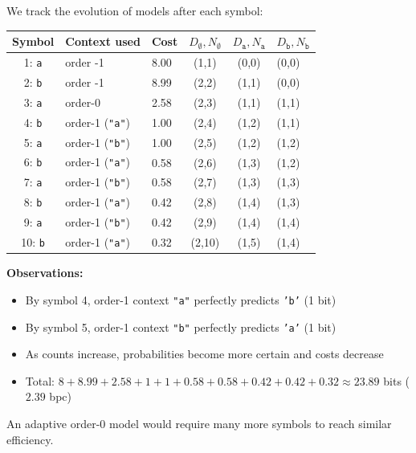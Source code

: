 \begin{examplebox}

We track the evolution of models after each symbol:

\begin{center}
\footnotesize
\begin{tabular}{|c|l|l|c|c|l|}
\hline
\textbf{Symbol} & \textbf{Context used} & \textbf{Cost} & $D_{\emptyset},N_{\emptyset}$ & $D_{\texttt{a}},N_{\texttt{a}}$ & $D_{\texttt{b}},N_{\texttt{b}}$ \\
\hline
1: \texttt{a} & order -1 & 8.00 & (1,1) & (0,0) & (0,0) \\
2: \texttt{b} & order -1 & 8.99 & (2,2) & (1,1) & (0,0) \\
3: \texttt{a} & order-0 & 2.58 & (2,3) & (1,1) & (1,1) \\
4: \texttt{b} & order-1 (\texttt{"a"}) & 1.00 & (2,4) & (1,2) & (1,1) \\
5: \texttt{a} & order-1 (\texttt{"b"}) & 1.00 & (2,5) & (1,2) & (1,2) \\
6: \texttt{b} & order-1 (\texttt{"a"}) & 0.58 & (2,6) & (1,3) & (1,2) \\
7: \texttt{a} & order-1 (\texttt{"b"}) & 0.58 & (2,7) & (1,3) & (1,3) \\
8: \texttt{b} & order-1 (\texttt{"a"}) & 0.42 & (2,8) & (1,4) & (1,3) \\
9: \texttt{a} & order-1 (\texttt{"b"}) & 0.42 & (2,9) & (1,4) & (1,4) \\
10: \texttt{b} & order-1 (\texttt{"a"}) & 0.32 & (2,10) & (1,5) & (1,4) \\
\hline
\end{tabular}
\end{center}

\textbf{Observations:}
\begin{itemize}
    \item By symbol 4, order-1 context \texttt{"a"} perfectly predicts \texttt{'b'} (1 bit)
    \item By symbol 5, order-1 context \texttt{"b"} perfectly predicts \texttt{'a'} (1 bit)
    \item As counts increase, probabilities become more certain and costs decrease
    \item Total: $8+8.99+2.58+1+1+0.58+0.58+0.42+0.42+0.32 \approx 23.89$ bits ($2.39$ bpc)
\end{itemize}
An adaptive order-0 model would require many more symbols to reach similar efficiency.
\end{examplebox}

